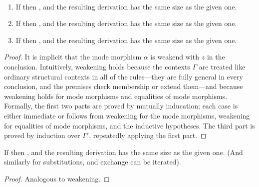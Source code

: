 \begin{lemma} \label{thm:weakening} ~
\begin{enumerate}
\item If  then
, and the resulting
derivation has the same size as the given one.  
\item If  then
, and the resulting
derivation has the same size as the given one.  
\item If  then
, and the resulting
derivation has the same size as the given one.  
\end{enumerate}
\end{lemma}
\begin{proof}
It is implicit that the mode morphism $\alpha$ is weakend with $z$ in
the conclusion.  Intuitively, weakening holds because the contexts
$\Gamma$ are treated like ordinary structural contexts in all of the
rules---they are fully general in every conclusion, and the premises
check membership or extend them---and because weakening holds for mode
morphisms and equalities of mode morphisms.  Formally, the first two
parts are proved by mutually inducation; each case is either immediate
or follows from weakening for the mode morphisms, weakening for
equalities of mode morphisms, and the inductive hypotheses.  The third
part is proved by induction over $\Gamma'$, repeatedly applying the
first part.  
\end{proof}

\begin{lemma}
If  then
, and the resulting derivation
has the same size as the given one.  (And similarly for substitutions,
and exchange can be iterated).  
\end{lemma}
\begin{proof} Analogous to weakening.  
\end{proof}

